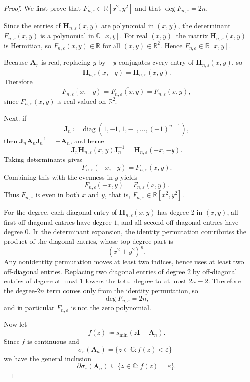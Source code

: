\documentclass[11pt]{article}
\begin{document}
\begin{proof}
We first prove that $F_{n,\varepsilon}\in\mathbb{R}[x^2,y^2]$ and that
$\deg F_{n,\varepsilon}=2n$.

Since the entries of $\mathbf{H}_{n,\varepsilon}(x,y)$ are polynomial in $(x,y)$,
the determinant $F_{n,\varepsilon}(x,y)$ is a polynomial in $\mathbb{C}[x,y]$.
For real $(x,y)$, the matrix $\mathbf{H}_{n,\varepsilon}(x,y)$ is Hermitian, so
$F_{n,\varepsilon}(x,y)\in\mathbb{R}$ for all $(x,y)\in\mathbb{R}^2$.
Hence $F_{n,\varepsilon}\in\mathbb{R}[x,y]$.

Because $\mathbf{A}_n$ is real, replacing $y$ by $-y$ conjugates every entry of
$\mathbf{H}_{n,\varepsilon}(x,y)$, so
\[
\mathbf{H}_{n,\varepsilon}(x,-y)=\overline{\mathbf{H}_{n,\varepsilon}(x,y)}.
\]
Therefore
\[
F_{n,\varepsilon}(x,-y)=\overline{F_{n,\varepsilon}(x,y)}=F_{n,\varepsilon}(x,y),
\]
since $F_{n,\varepsilon}(x,y)$ is real-valued on $\mathbb{R}^2$.

Next, if
\[
\mathbf{J}_n\coloneqq \operatorname{diag}(1,-1,1,-1,\dots,(-1)^{n-1}),
\]
then $\mathbf{J}_n\mathbf{A}_n\mathbf{J}_n^{-1}=-\mathbf{A}_n$, and hence
\[
\mathbf{J}_n\mathbf{H}_{n,\varepsilon}(x,y)\mathbf{J}_n^{-1}
=\mathbf{H}_{n,\varepsilon}(-x,-y).
\]
Taking determinants gives
\[
F_{n,\varepsilon}(-x,-y)=F_{n,\varepsilon}(x,y).
\]
Combining this with the evenness in $y$ yields
\[
F_{n,\varepsilon}(-x,y)=F_{n,\varepsilon}(x,y).
\]
Thus $F_{n,\varepsilon}$ is even in both $x$ and $y$, that is,
$F_{n,\varepsilon}\in\mathbb{R}[x^2,y^2]$.

For the degree, each diagonal entry of $\mathbf{H}_{n,\varepsilon}(x,y)$ has degree $2$ in $(x,y)$,
all first off-diagonal entries have degree $1$, and all second off-diagonal entries have degree $0$.
In the determinant expansion, the identity permutation contributes the product of the diagonal entries,
whose top-degree part is
\[
(x^2+y^2)^n.
\]
Any nonidentity permutation moves at least two indices, hence uses at least two off-diagonal entries.
Replacing two diagonal entries of degree $2$ by off-diagonal entries of degree at most $1$
lowers the total degree to at most $2n-2$.
Therefore the degree-$2n$ term comes only from the identity permutation, so
\[
\deg F_{n,\varepsilon}=2n,
\]
and in particular $F_{n,\varepsilon}$ is not the zero polynomial.

Now let
\[
f(z)\coloneqq s_{\min}(z\mathbf{I}-\mathbf{A}_n).
\]
Since $f$ is continuous and
\[
\sigma_\varepsilon(\mathbf{A}_n)=\{z\in\mathbb{C}\colon f(z)<\varepsilon\},
\]
we have the general inclusion
\[
\partial\sigma_\varepsilon(\mathbf{A}_n)\subseteq \{z\in\mathbb{C}\colon f(z)=\varepsilon\}.
\]


\end{proof}
\end{document}
